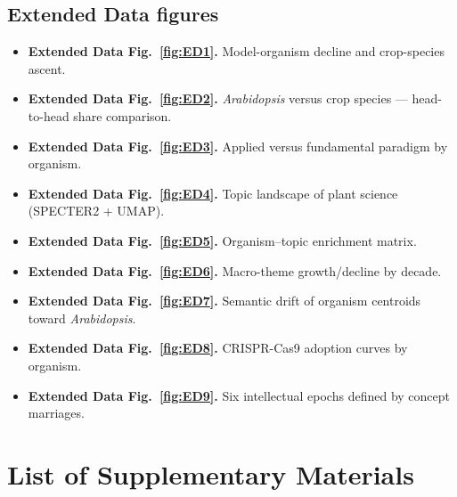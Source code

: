 \subsection*{Extended Data figures}
\begin{itemize}\setlength{\itemsep}{2pt}

\item \textbf{Extended Data Fig.~\ref{fig:ED1}.} Model-organism decline and
        crop-species ascent.
\item \textbf{Extended Data Fig.~\ref{fig:ED2}.} \textit{Arabidopsis} versus
        crop species --- head-to-head share comparison.
\item \textbf{Extended Data Fig.~\ref{fig:ED3}.} Applied versus fundamental
        paradigm by organism.
\item \textbf{Extended Data Fig.~\ref{fig:ED4}.} Topic landscape of plant
        science (SPECTER2 + UMAP).
\item \textbf{Extended Data Fig.~\ref{fig:ED5}.} Organism--topic enrichment
        matrix.
\item \textbf{Extended Data Fig.~\ref{fig:ED6}.} Macro-theme growth/decline
        by decade.
\item \textbf{Extended Data Fig.~\ref{fig:ED7}.} Semantic drift of organism
        centroids toward \textit{Arabidopsis}.
\item \textbf{Extended Data Fig.~\ref{fig:ED8}.} CRISPR-Cas9 adoption curves
        by organism.
\item \textbf{Extended Data Fig.~\ref{fig:ED9}.} Six intellectual epochs
        defined by concept marriages.
\end{itemize}

\clearpage
\section*{List of Supplementary Materials}

